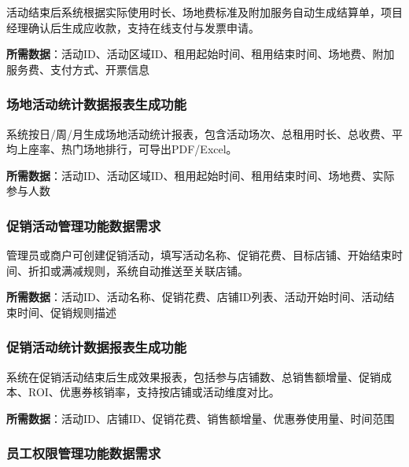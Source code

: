 \documentclass[]{article}
\begin{document}
活动结束后系统根据实际使用时长、场地费标准及附加服务自动生成结算单，项目经理确认后生成应收款，支持在线支付与发票申请。

\textbf{所需数据}：活动ID、活动区域ID、租用起始时间、租用结束时间、场地费、附加服务费、支付方式、开票信息

\hypertarget{ux573aux5730ux6d3bux52a8ux7edfux8ba1ux6570ux636eux62a5ux8868ux751fux6210ux529fux80fd}{%
\subsubsection{场地活动统计数据报表生成功能}\label{ux573aux5730ux6d3bux52a8ux7edfux8ba1ux6570ux636eux62a5ux8868ux751fux6210ux529fux80fd}}

系统按日/周/月生成场地活动统计报表，包含活动场次、总租用时长、总收费、平均上座率、热门场地排行，可导出PDF/Excel。

\textbf{所需数据}：活动ID、活动区域ID、租用起始时间、租用结束时间、场地费、实际参与人数

\hypertarget{ux4fc3ux9500ux6d3bux52a8ux7ba1ux7406ux529fux80fdux6570ux636eux9700ux6c42}{%
\subsubsection{促销活动管理功能数据需求}\label{ux4fc3ux9500ux6d3bux52a8ux7ba1ux7406ux529fux80fdux6570ux636eux9700ux6c42}}

管理员或商户可创建促销活动，填写活动名称、促销花费、目标店铺、开始结束时间、折扣或满减规则，系统自动推送至关联店铺。

\textbf{所需数据}：活动ID、活动名称、促销花费、店铺ID列表、活动开始时间、活动结束时间、促销规则描述

\hypertarget{ux4fc3ux9500ux6d3bux52a8ux7edfux8ba1ux6570ux636eux62a5ux8868ux751fux6210ux529fux80fd}{%
\subsubsection{促销活动统计数据报表生成功能}\label{ux4fc3ux9500ux6d3bux52a8ux7edfux8ba1ux6570ux636eux62a5ux8868ux751fux6210ux529fux80fd}}

系统在促销活动结束后生成效果报表，包括参与店铺数、总销售额增量、促销成本、ROI、优惠券核销率，支持按店铺或活动维度对比。

\textbf{所需数据}：活动ID、店铺ID、促销花费、销售额增量、优惠券使用量、时间范围

\hypertarget{ux5458ux5de5ux6743ux9650ux7ba1ux7406ux529fux80fdux6570ux636eux9700ux6c42}{%
\subsubsection{员工权限管理功能数据需求}\label{ux5458ux5de5ux6743ux9650ux7ba1ux7406ux529fux80fdux6570ux636eux9700ux6c42}}
\end{document}
